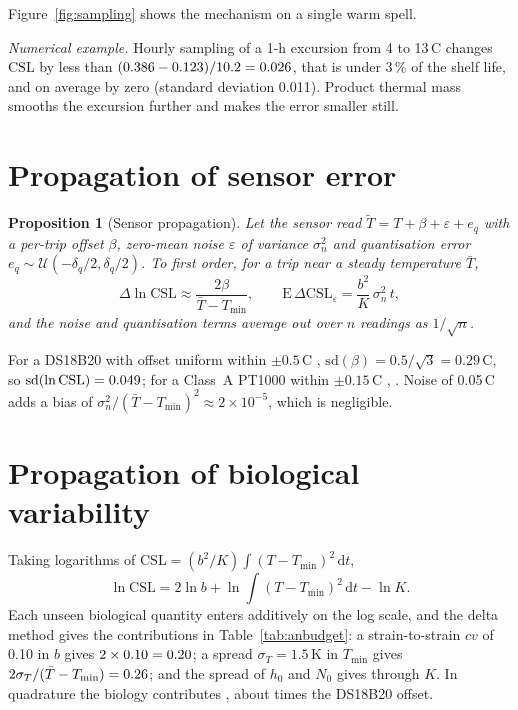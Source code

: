 \documentclass[11pt,a4paper,twoside,openany]{book}
\newcommand{\CSL}{\mathrm{CSL}}
\newcommand{\dd}{\,\mathrm{d}}
\newcommand{\degC}{\,\textdegree C}
\theoremstyle{plain}\newtheorem{proposition}{Proposition}\newtheorem{corollary}{Corollary}
\theoremstyle{definition}\newtheorem{definition}{Definition}[chapter]
\newenvironment{worked}{\par\smallskip\noindent\textit{Numerical example.}\enspace}{\par\smallskip}
\begin{document}
Figure~\ref{fig:sampling} shows the mechanism on a single warm spell.

\begin{worked}
Hourly sampling of a 1-h excursion from 4 to 13\degC{} changes $\CSL$ by less than $(0.386-0.123)/10.2=0.026$, that is under 3\,\% of the shelf life, and on average by zero (standard deviation 0.011). Product thermal mass smooths the excursion further and makes the error smaller still.
\end{worked}


\section{Propagation of sensor error}
\begin{proposition}[Sensor propagation]\label{prop:sensor}
Let the sensor read $\tilde T=T+\beta+\varepsilon+e_q$ with a per-trip offset $\beta$, zero-mean noise $\varepsilon$ of variance $\sigma_n^2$ and quantisation error $e_q\sim\mathcal U(-\delta_q/2,\delta_q/2)$. To first order, for a trip near a steady temperature $\bar T$,
\begin{equation}\label{eq:sensor}
\Delta\ln\CSL\approx\frac{2\beta}{\bar T-T_{\min}},\qquad \mathrm{E}\,\Delta\CSL_{\varepsilon}=\frac{b^2}{K}\,\sigma_n^2\,t,
\end{equation}
and the noise and quantisation terms average out over $n$ readings as $1/\sqrt n$.
\end{proposition}
For a DS18B20 with offset uniform within $\pm0.5$\degC{} \cite{ds18b20}, $\mathrm{sd}(\beta)=0.5/\sqrt3=0.29$\degC, so $\mathrm{sd}(\ln\CSL)=\AnSdDS$; for a Class~A PT1000 within $\pm0.15$\degC{} \cite{iec60751}, \AnSdPT. Noise of 0.05\degC{} adds a bias of $\sigma_n^2/(\bar T-T_{\min})^2\approx2\times10^{-5}$, which is negligible.

\section{Propagation of biological variability}
Taking logarithms of $\CSL=(b^2/K)\int(T-T_{\min})^2\dd t$,
\begin{equation}\label{eq:lncsl}
\ln\CSL=2\ln b+\ln\!\int(T-T_{\min})^2\dd t-\ln K .
\end{equation}
Each unseen biological quantity enters additively on the log scale, and the delta method gives the contributions in Table~\ref{tab:anbudget}: a strain-to-strain $cv$ of 0.10 in $b$ gives $2\times0.10=0.20$; a spread $\sigma_T=1.5$\,K in $T_{\min}$ gives $2\sigma_T/(\bar T-T_{\min})=0.26$; and the spread of $h_0$ and $N_0$ gives \AnSdK{} through $K$. In quadrature the biology contributes \AnSdBio, about \AnRatio{} times the DS18B20 offset.
\end{document}
